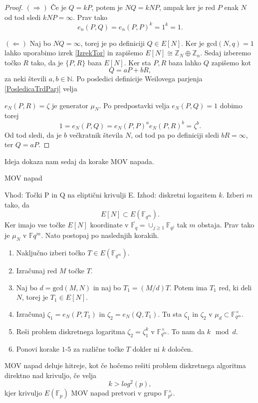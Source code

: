 \documentclass[12pt,a4paper,twoside]{article}
\theoremstyle{definition} %
\theoremstyle{plain} %
\numberwithin{equation}{section}  %
\newcommand{\N}{\mathbb N}
\newcommand{\Z}{\mathbb Z}
\newcommand{\F}{\mathbb F}
\newcommand{\Fq}[1]{{\mathbb{F}_{#1}}}
\newcommand{\E}[1]{E({#1})}
\begin{document}
\begin{proof}
$(\Rightarrow)$ Če je $Q = kP$, potem je $NQ = kNP$, ampak ker je red $P$ enak $N$ od tod sledi $kNP = \infty$. Prav tako
$$e_n(P,Q) = e_n(P,P)^k = 1^k = 1.$$

$(\Leftarrow)$ Naj bo $NQ = \infty$, torej je po definiciji $Q \in E[N]$. Ker je $\text{gcd}(N,q) = 1$ lahko uporabimo izrek \ref{IzrekTor} in zapišemo 
$E[N] \cong \Z_N \oplus \Z_n$. Sedaj izberemo točko $R$ tako, da je $\{P,R \}$ baza $E[N]$. Ker sta $P,R$ baza  lahko $Q$ zapišemo kot
$$Q = aP+bR,$$
za neki števili $a,b \in \N$. Po posledici definicije Weilovega parjenja \ref{PosledicaTrdParj} velja 

\noindent $e_N(P,R)=\zeta$ je generator $\mu_N$.
Po predpostavki velja $e_N(P,Q) = 1$ dobimo torej
$$1 = e_N(P,Q) = e_N(P,P)^ae_N(P,R)^b = \zeta^b.$$
Od tod sledi, da je $b$ večkratnik števila $N$, od tod pa po definiciji sledi $bR = \infty$, ter $Q = aP$.
\end{proof}

Ideja dokaza nam sedaj da korake MOV napada.

\begin{algorithm}[H]
\caption[MOV]{MOV napad}
\label{alg:MOV}
Vhod: Točki P in Q na eliptični krivulji E.\newline
Izhod: diskretni logaritem $k$.\newline
Izberi $m$ tako, da $$E[N] \subset \E{\Fq{q^m}}.$$
Ker imajo vse točke $E[N]$ koordinate v $\overline{\Fq{q}} = \cup_{j\geq 1}\F_{q^j}$ tak $m$ obstaja. Prav tako je $\mu_N$ v $\F{q^m}$.
Nato postopaj po naslednjih korakih.
\begin{enumerate}
\item Naključno izberi točko $T \in \E{\Fq{q^m}}$.
\item Izračunaj red $M$ točke $T$.
\item Naj bo $d = \text{gcd}(M,N)$ in naj bo $T_1 = (M/d)T$. Potem ima $T_1$ red, ki deli $N$, torej je $T_1 \in E[N]$.
\item Izračunaj $\zeta_1 = e_N(P,T_1)$ in $\zeta_2 = e_N(Q,T_1)$. Tu sta $\zeta_1$ in $\zeta_2$ v $\mu_d \subset \F_{q^m}^\times$.
\item Reši problem diskretnega logaritma $\zeta_2 = \zeta_1^k$ v $\F_{q^m}^\times$. To nam da $k \mod d$.
\item Ponovi korake $1$-$5$ za različne točke $T$ dokler ni $k$ določen.
\end{enumerate}

\end{algorithm}
MOV napad deluje hitreje, kot če hočemo rešiti problem diskretnega algoritma direktno nad krivuljo, če velja 
$$k > log^2(p),$$
kjer krivuljo $E(\F_p)$ MOV napad pretvori v grupo $\F^{\times}_{p^k}$.
\end{document}
